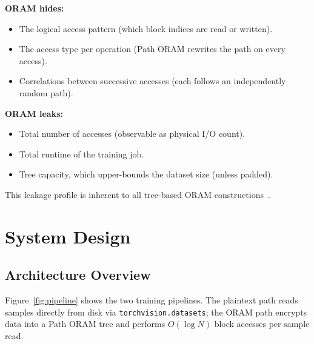 \documentclass{llncs}
\begin{document}
\noindent\textbf{ORAM hides:}
\begin{itemize}[nosep]
    \item The logical access pattern (which block indices are read or written).
    \item The access type per operation (Path ORAM rewrites the path on every access).
    \item Correlations between successive accesses (each follows an independently random path).
\end{itemize}

\noindent\textbf{ORAM leaks:}
\begin{itemize}[nosep]
    \item Total number of accesses (observable as physical I/O count).
    \item Total runtime of the training job.
    \item Tree capacity, which upper-bounds the dataset size (unless padded).
\end{itemize}

\noindent This leakage profile is inherent to all tree-based ORAM constructions~\cite{goldreich1996,stefanov2013}.

\section{System Design}
\label{sec:design}

\subsection{Architecture Overview}

Figure~\ref{fig:pipeline} shows the two training pipelines.
The plaintext path reads samples directly from disk via \texttt{torchvision.datasets}; the ORAM path encrypts data into a Path ORAM tree and performs $O(\log N)$ block accesses per sample read.
\end{document}
